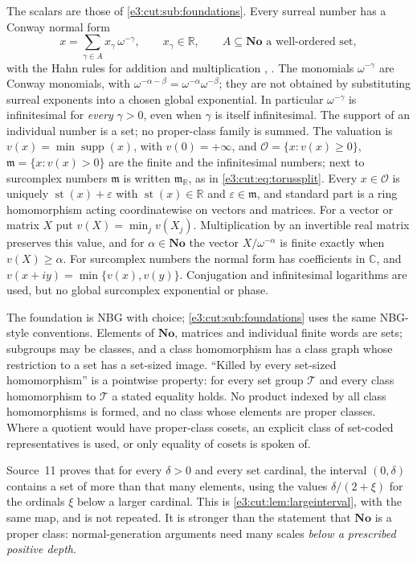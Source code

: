 \documentclass[11pt,letterpaper]{article}
\numberwithin{equation}{section}
\theoremstyle{definition}
\theoremstyle{remark}
\newcommand{\No}{\mathbf{No}}
\newcommand{\R}{\mathbb R}
\newcommand{\C}{\mathbb C}
\newcommand{\OO}{\mathcal O}
\newcommand{\mm}{\mathfrak m}
\newcommand{\eps}{\varepsilon}
\newcommand{\st}{\operatorname{st}}
\newcommand{\supp}{\operatorname{supp}}
\begin{document}
The scalars are those of \cref{e3:cut:sub:foundations}. Every surreal number has
a Conway normal form
\begin{equation}\label{e3:cpt:eq:normalform}
 x=\sum_{\gamma\in A}x_\gamma\,\omega^{-\gamma},
 \qquad x_\gamma\in\R,
 \qquad A\subseteq\No\text{ a well-ordered set},
\end{equation}
with the Hahn rules for addition and multiplication
\cite[Section~2.3]{BG}, \cite{Conway,Gonshor}. The monomials $\omega^{-\gamma}$
are Conway monomials, with
$\omega^{-\alpha-\beta}=\omega^{-\alpha}\omega^{-\beta}$; they are not obtained
by substituting surreal exponents into a chosen global exponential. In
particular $\omega^{-\gamma}$ is infinitesimal for \emph{every} $\gamma>0$,
even when $\gamma$ is itself infinitesimal. The support of an individual number
is a set; no proper-class family is summed. The valuation is
$v(x)=\min\supp(x)$, with $v(0)=+\infty$, and
$\OO=\{x:v(x)\ge0\}$, $\mm=\{x:v(x)>0\}$ are the finite and the infinitesimal
numbers; next to surcomplex numbers $\mm$ is written $\mm_{\R}$, as in
\cref{e3:cut:eq:torussplit}. Every $x\in\OO$ is uniquely $\st(x)+\eps$ with $\st(x)\in\R$ and
$\eps\in\mm$, and standard part is a ring homomorphism acting coordinatewise on
vectors and matrices. For a vector or matrix $X$ put $v(X)=\min_jv(X_j)$.
Multiplication by an invertible real matrix preserves this value, and for
$\alpha\in\No$ the vector $X/\omega^{-\alpha}$ is finite exactly when
$v(X)\ge\alpha$. For surcomplex numbers the normal form has coefficients in
$\C$, and $v(x+iy)=\min\{v(x),v(y)\}$. Conjugation and infinitesimal logarithms
are used, but no global surcomplex exponential or phase.

The foundation is NBG with choice; \cref{e3:cut:sub:foundations} uses the same
NBG-style conventions.
Elements of $\No$, matrices and individual finite words are sets; subgroups may
be classes, and a class homomorphism has a class graph whose restriction to a
set has a set-sized image. ``Killed by every set-sized homomorphism'' is a
pointwise property: for every set group $\mathcal T$ and every class
homomorphism to $\mathcal T$ a stated equality holds. No product indexed by all
class homomorphisms is formed, and no class whose elements are proper classes.
Where a quotient would have proper-class cosets, an explicit class of set-coded
representatives is used, or only equality of cosets is spoken of.

Source~11 proves that for every $\delta>0$ and every set cardinal, the interval
$(0,\delta)$ contains a set of more than that many elements, using the values
$\delta/(2+\xi)$ for the ordinals $\xi$ below a larger cardinal. This is
\cref{e3:cut:lem:largeinterval}, with the same map, and is not repeated. It is
stronger than the statement that $\No$ is a proper class: normal-generation
arguments need many scales \emph{below a prescribed positive depth}.
\end{document}
